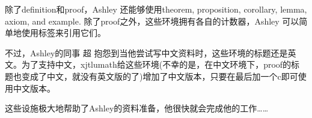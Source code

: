 除了definition和proof，Ashley 还能够使用theorem, proposition, corollary, lemma, axiom, and example. 除了proof之外，这些环境拥有各自的计数器，Ashley 可以简单地使用标签来引用它们。

不过，Ashley的同事 超 抱怨到当他尝试写中文资料时，这些环境的标题还是英文。为了支持中文，xjtlumath给这些环境(不幸的是，在中文环境下，proof的标题也变成了中文，就没有英文版的了)增加了中文版本，只要在最后加一个c即可使用中文版本。

这些设施极大地帮助了Ashley的资料准备，他很快就会完成他的工作……